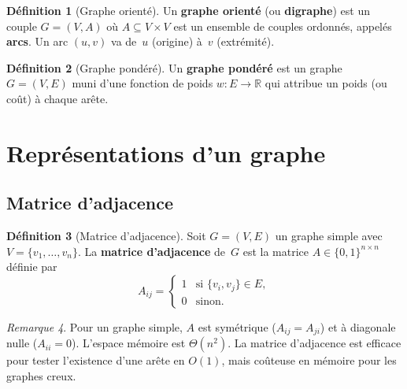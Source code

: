 \documentclass[12pt,a4paper,openany]{book}
\theoremstyle{definition}
\newtheorem{definition}{Définition}[chapter]
\theoremstyle{plain}
\theoremstyle{remark}
\newtheorem{remarque}[definition]{Remarque}
\newcommand{\R}{\mathbb{R}}
\begin{document}
\begin{definition}[Graphe orienté]
\label{def:digraphe}
Un \textbf{graphe orienté} (ou \textbf{digraphe}) est un couple $G = (V, A)$ où
$A \subseteq V \times V$ est un ensemble de couples ordonnés, appelés
\textbf{arcs}. Un arc $(u, v)$ va de~$u$ (origine) à~$v$ (extrémité).
\end{definition}

\begin{definition}[Graphe pondéré]
\label{def:graphe-pondere}
Un \textbf{graphe pondéré} est un graphe $G = (V, E)$ muni d'une fonction de
poids $w \colon E \to \R$ qui attribue un poids (ou coût) à chaque arête.
\end{definition}

\section{Représentations d'un graphe}
\label{sec:representations}

\subsection{Matrice d'adjacence}
\label{subsec:matrice-adj}

\begin{definition}[Matrice d'adjacence]
\label{def:matrice-adj}
Soit $G = (V, E)$ un graphe simple avec $V = \{v_1, \ldots, v_n\}$.
La \textbf{matrice d'adjacence} de~$G$ est la matrice $A \in \{0,1\}^{n \times n}$
définie par
\[
  A_{ij} = \begin{cases} 1 & \text{si } \{v_i, v_j\} \in E, \\ 0 & \text{sinon.} \end{cases}
\]
\end{definition}

\begin{remarque}
Pour un graphe simple, $A$ est symétrique ($A_{ij} = A_{ji}$) et à diagonale
nulle ($A_{ii} = 0$). L'espace mémoire est $\Theta(n^2)$. La matrice d'adjacence
est efficace pour tester l'existence d'une arête en $O(1)$, mais coûteuse en
mémoire pour les graphes creux.
\end{remarque}
\end{document}
